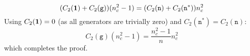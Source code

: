 \begin{equation*}
  (C_2(\mathbf{1}) + C_2(\mathtt{g})) (n_c^2 - 1) = (C_2(\mathtt{n}) + C_2(\mathtt{n}^*)) n_c^2
\end{equation*}
Using $ C_2(\mathbf{1}) = 0 $ (as all generators are trivially zero) and $ C_2(\mathtt{n}^*) = C_2(\mathtt{n}) $:
\begin{equation*}
  C_2(\mathtt{g}) (n_c^2 - 1) = \frac{n_c^2 - 1}{n} n_c^2
\end{equation*}
which completes the proof.










